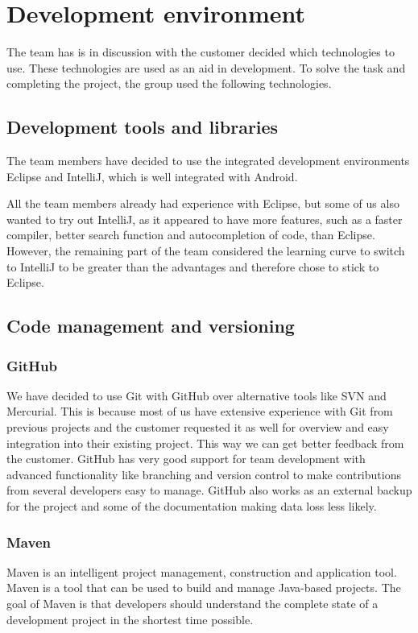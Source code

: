 \chapter{Development environment}

The team has is in discussion with the customer decided which technologies to use. These technologies are used as an aid in development. To solve the task and completing the project, the group used the following technologies.

\section{Development tools and libraries}

The team members have decided to use the  integrated development environments Eclipse and IntelliJ, which is well integrated with Android. 

All the team members already had experience with Eclipse, but some of us also wanted to try out IntelliJ, as it appeared to have more features, such as a faster compiler, better search function and autocompletion of code, than Eclipse. However, the remaining part of the team considered the learning curve to switch to IntelliJ to be greater than the advantages and therefore chose to stick to Eclipse.

\section{Code management and versioning}
\subsection{GitHub}
We have decided to use Git with GitHub over alternative tools like SVN and Mercurial. This is because most of us have extensive experience with Git from previous projects and the customer requested it as well for overview and easy integration into their existing project. This way we can get better feedback from the customer. GitHub has very good support for team development with advanced functionality like branching and version control to make contributions from several developers easy to manage. GitHub also works as an external backup for the project and some of the documentation making data loss less likely.

\subsection{Maven}
Maven is an intelligent project management, construction and application tool. Maven is a tool that can be used to build and manage Java-based projects. The goal of Maven is that developers should understand the complete state of a development project in the shortest time possible.

